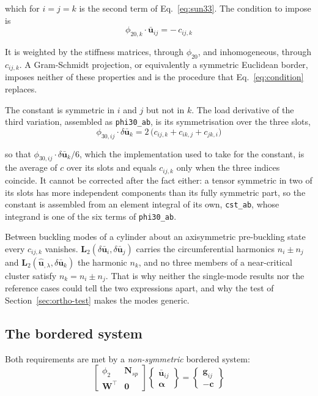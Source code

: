 \documentclass[11pt,a4paper]{article}
\begin{document}
\noindent which for $i = j = k$ is the second term of Eq.~\ref{eq:sun33}.  The
condition to impose is
\begin{equation}\label{eq:condition}
	\phi_{20,k}\cdot\boldsymbol{\bar{u}}_{ij} = -\,c_{ij,k}
\end{equation}

It is weighted by the stiffness matrices, through $\phi_{20}$, and
inhomogeneous, through $c_{ij,k}$.  A Gram-Schmidt projection, or equivalently
a symmetric Euclidean border, imposes neither of these properties and is the
procedure that Eq.~\ref{eq:condition} replaces.

The constant is symmetric in $i$ and $j$ but not in $k$.  The load derivative
of the third variation, assembled as \texttt{phi30\_ab}, is its
symmetrisation over the three slots,
\begin{equation}
	\phi_{30,ij}\cdot\delta\boldsymbol{\bar{u}}_k
	= 2\,\big(c_{ij,k} + c_{ik,j} + c_{jk,i}\big)
\end{equation}

\noindent so that $\phi_{30,ij}\cdot\delta\boldsymbol{\bar{u}}_k/6$, which the
implementation used to take for the constant, is the average of $c$ over its
slots and equals $c_{ij,k}$ only when the three indices coincide.  It cannot
be corrected after the fact either: a tensor symmetric in two of its slots
has more independent components than its fully symmetric part, so the
constant is assembled from an element integral of its own,
\texttt{cst\_ab}, whose integrand is one of the six terms of
\texttt{phi30\_ab}.

Between buckling modes of a cylinder about an axisymmetric pre-buckling state
every $c_{ij,k}$ vanishes.  $\boldsymbol{L}_2(\delta\boldsymbol{\bar{u}}_i,
\delta\boldsymbol{\bar{u}}_j)$ carries the circumferential harmonics
$n_i \pm n_j$ and $\boldsymbol{L}_2(\boldsymbol{\hat{u}}_{,\lambda},
\delta\boldsymbol{\bar{u}}_k)$ the harmonic $n_k$, and no three members of a
near-critical cluster satisfy $n_k = n_i \pm n_j$.  That is why neither the
single-mode results nor the reference cases could tell the two expressions
apart, and why the test of Section~\ref{sec:ortho-test} makes the modes
generic.

\subsection{The bordered system}

Both requirements are met by a \emph{non-symmetric} bordered system:
\begin{equation}\label{eq:bordered}
	\begin{bmatrix}
	  \phi_2 & \boldsymbol{N}_{sp} \\[2pt]
	  \boldsymbol{W}^\top & \boldsymbol{0}
	\end{bmatrix}
	\begin{Bmatrix} \boldsymbol{\bar{u}}_{ij} \\ \boldsymbol{\alpha} \end{Bmatrix}
	=
	\begin{Bmatrix} \boldsymbol{g}_{ij} \\ -\boldsymbol{c} \end{Bmatrix}
\end{equation}
\end{document}

